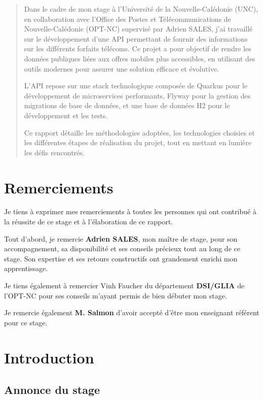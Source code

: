 \documentclass{article}
\begin{document}
	\begin{abstract}
		Dans le cadre de mon stage à l'Université de la Nouvelle-Calédonie (UNC), en collaboration avec l'Office des Postes et Télécommunications de Nouvelle-Calédonie (OPT-NC) supervisé par Adrien SALES, j'ai travaillé sur le développement d'une API permettant de fournir des informations sur les différents forfaits télécoms. Ce projet a pour objectif de rendre les données publiques liées aux offres mobiles plus accessibles, en utilisant des outils modernes pour assurer une solution efficace et évolutive.
		
		L'API repose sur une stack technologique composée de Quarkus pour le développement de microservices performants, Flyway pour la gestion des migrations de base de données, et une base de données H2 pour le développement et les tests. 
		
		Ce rapport détaille les méthodologies adoptées, les technologies choisies et les différentes étapes de réalisation du projet, tout en mettant en lumière les défis rencontrés.
	\end{abstract}
	\newpage
	\section*{Remerciements}
	
	Je tiens à exprimer mes remerciements à toutes les personnes qui ont contribué à la réussite de ce stage et à l’élaboration de ce rapport.
	
	Tout d’abord, je remercie \textbf{Adrien SALES}, mon maître de stage, pour son accompagnement, sa disponibilité et ses conseils précieux tout au long de ce stage. Son expertise et ses retours constructifs ont grandement enrichi mon apprentissage.
	
	Je tiens également à remercier Vinh Faucher du département \textbf{DSI/GLIA} de l’OPT-NC pour ses conseils m'ayant permis de bien débuter mon stage.
	
	Je remercie également \textbf{M. Salmon} d’avoir accepté d’être mon enseignant référent pour ce stage.
		
	\newpage
	\tableofcontents
	\newpage
	\section{Introduction}
	
	\subsection{Annonce du stage}
	
\end{document}
